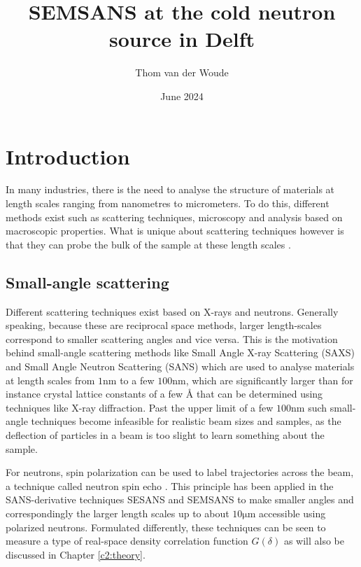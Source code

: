 \documentclass{article}
\title{SEMSANS at the cold neutron source in Delft}
\author{Thom van der Woude}
\date{June 2024}
\begin{document}
\maketitle

\section{Introduction}
In many industries, there is the need to analyse the structure of materials at length scales ranging from nanometres to micrometers. To do this, different methods exist such as scattering techniques, microscopy and analysis based on macroscopic properties. What is unique about scattering techniques however is that they can probe the bulk of the sample at these length scales \cite{bouwman2021}.


\subsection{Small-angle scattering}

Different scattering techniques exist based on X-rays and neutrons. Generally speaking, because these are reciprocal space methods, larger length-scales correspond to smaller scattering angles and vice versa. This is the motivation behind small-angle scattering methods like Small Angle X-ray Scattering (SAXS) and Small Angle Neutron Scattering (SANS) which are used to analyse materials at length scales from $1 \unit{\nano\meter}$ to a few $100 \unit{\nano\meter}$, which are significantly larger than for instance crystal lattice constants of a few $\unit{Å}$ that can be determined using techniques like X-ray diffraction. Past the upper limit of a few $100 \unit{\nano\meter}$ such small-angle techniques become infeasible for realistic beam sizes and samples, as the deflection of particles in a beam is too slight to learn something about the sample.

For neutrons, spin polarization can be used to label trajectories across the beam, a technique called neutron spin echo \cite{mezei1972}. This principle has been applied in the SANS-derivative techniques SESANS \cite{rekveldt1996} and SEMSANS \cite{bouwman2009}\cite{bouwman2011} to make smaller angles and correspondingly the larger length scales up to about $10 \unit{\micro\meter}$ accessible using polarized neutrons. Formulated differently, these techniques can be seen to measure a type of real-space density correlation function $G(\delta)$ \cite{krouglov2003}\cite{andersson2008} as will also be discussed in Chapter \ref{c2:theory}.
\end{document}
